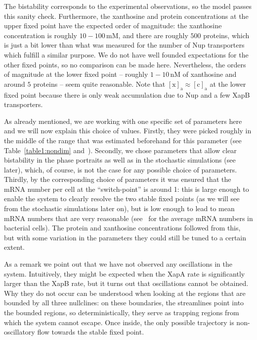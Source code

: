 \documentclass[10pt,letterpaper]{article}
\newcommand{\unit}[1]{\,\mathrm{#1}}
\newcommand{\n}[1]{\mathrm{#1}}
\begin{document}
	The bistability corresponds to the experimental observations, so the model passes this
	sanity check. Furthermore, the xanthosine and protein concentrations at the
	upper fixed point have the expected order of magnitude: the xanthosine
	concentration is roughly $10-100 \unit{mM}$, and there are roughly $500$
	proteins, which is just a bit lower than what was measured for the number of
	Nup transporters~\cite{Li2014} which fulfill a similar purpose. We do not
	have well founded expectations for the other fixed points, so no comparison
	can be made here. Nevertheless, the orders of magnitude at the lower fixed
	point -- roughly $1-10 \unit{nM}$ of xanthosine and around $5$ proteins --
	seem quite reasonable. Note that $\n{[x]_a} \approx \n{[c]_a}$ at the
	lower fixed point because there is only weak accumulation due to Nup and a
	few XapB transporters.
	
	As already mentioned, we are working with one specific set of parameters
	here and we will now explain this choice of values. Firstly, they were
	picked roughly in the middle of the range that was estimated beforehand for this parameter (see Table~\ref{table1:nondim} and~). Secondly, we
	chose parameters that allow clear bistability in the phase portraits as well as in the
	stochastic simulations (see later), which, of course, is not the case for any possible choice of parameters. Thirdly, by the corresponding choice of
	parameters it was ensured that the mRNA number per cell at the
	``switch-point'' is around 1: this is large enough to enable the system to
	clearly resolve the two stable fixed points (as we will see from the
	stochastic simulations later on), but is low enough to lead to mean mRNA
	numbers that are very reasonable (see~\cite{Milo2016} for the average mRNA
	numbers in bacterial cells). The protein and xanthosine
	concentrations followed from this, but with some variation in the parameters
	they could still be tuned to a certain extent.
	
	As a remark we point out that we have not observed any oscillations in the
	system. Intuitively, they might be expected when the XapA rate is
	significantly larger than the XapB rate, but it turns out that oscillations
	cannot be obtained. Why they do not occur can be understood when looking at the regions that
	are bounded by all three nullclines: on these boundaries, the streamlines
	point into the bounded regions, so deterministically, they serve as
	trapping regions from which the system cannot escape. Once inside, the only
	possible trajectory is non-oscillatory flow towards the stable fixed point.
	
\end{document}
